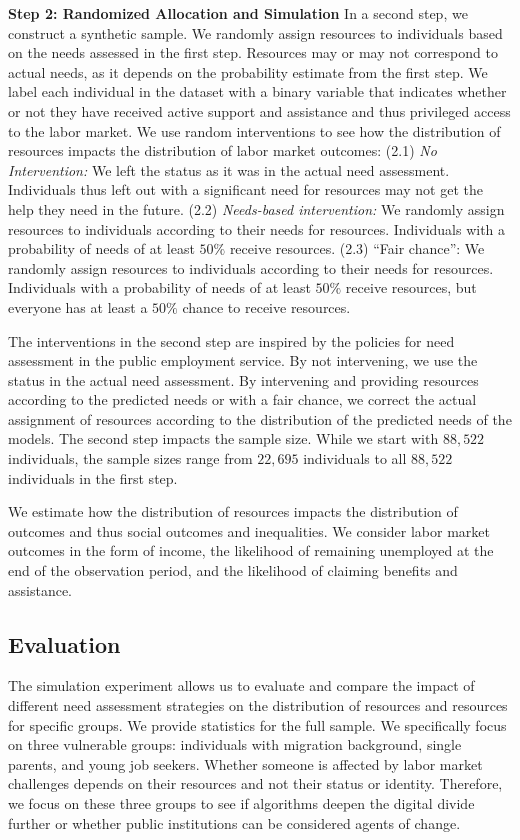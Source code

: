 \documentclass{article} %
\begin{document}
\textbf{Step 2: Randomized Allocation and Simulation}
In a second step, we construct a synthetic sample. We randomly assign resources to individuals based on the needs assessed in the first step. Resources may or may not correspond to actual needs, as it depends on the probability estimate from the first step. We label each individual in the dataset with a binary variable that indicates whether or not they have received active support and assistance and thus privileged access to the labor market. We use random interventions to see how the distribution of resources impacts the distribution of labor market outcomes: (2.1) \emph{No Intervention:} We left the status as it was in the actual need assessment. Individuals thus left out with a significant need for resources may not get the help they need in the future. (2.2) \emph{Needs-based intervention:} We randomly assign resources to individuals according to their needs for resources. Individuals with a probability of needs of at least $50\%$ receive resources. (2.3) ``Fair chance'': We randomly assign resources to individuals according to their needs for resources. Individuals with a probability of needs of at least $50\%$ receive resources, but everyone has at least a $50\%$ chance to receive resources.

The interventions in the second step are inspired by the policies for need assessment in the public employment service. By not intervening, we use the status in the actual need assessment. By intervening and providing resources according to the predicted needs or with a fair chance, we correct the actual assignment of resources according to the distribution of the predicted needs of the models.
The second step impacts the sample size. While we start with $88{,}522$ individuals, the sample sizes range from $22{,}695$ individuals to all $88{,}522$ individuals in the first step.

We estimate how the distribution of resources impacts the distribution of outcomes and thus social outcomes and inequalities. We consider labor market outcomes in the form of income, the likelihood of remaining unemployed at the end of the observation period, and the likelihood of claiming benefits and assistance.

\subsection{Evaluation}
\label{sec:eval}
The simulation experiment allows us to evaluate and compare the impact of different need assessment strategies on the distribution of resources and resources for specific groups. We provide statistics for the full sample. We specifically focus on three vulnerable groups: individuals with migration background, single parents, and young job seekers. Whether someone is affected by labor market challenges depends on their resources and not their status or identity. Therefore, we focus on these three groups to see if algorithms deepen the digital divide further or whether public institutions can be considered agents of change.
\end{document}
